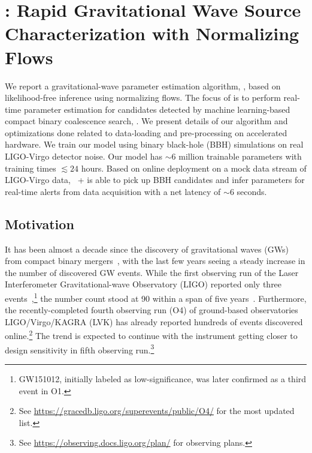\chapter{\amplfi: Rapid Gravitational Wave Source Characterization with Normalizing Flows}
\label{chap:amplfi_methods}
\begin{refsection}

We report a gravitational-wave parameter estimation algorithm, \amplfi, based on likelihood-free inference using normalizing flows. 
The focus of {\amplfi} is to perform real-time parameter estimation for candidates detected by machine learning-based compact binary coalescence search, \aframe. 
We present details of our algorithm and optimizations done related to data-loading and pre-processing on accelerated hardware. 
We train our model using binary black-hole (BBH) simulations on real LIGO-Virgo detector noise. 
Our model has $\sim 6$ million trainable parameters with training times $\lesssim 24$ hours. 
Based on online deployment on a mock data stream of LIGO-Virgo data, {\aframe~+ \amplfi} is able to pick up BBH candidates and infer parameters for real-time alerts from data acquisition with a net latency of $\sim 6$ seconds. 

\section{Motivation}
It has been almost a decade since the discovery of gravitational waves (GWs) from compact binary mergers~\cite{AbEA2016a}, with the last few years seeing a steady increase in the number of discovered GW events.
While the first observing run of the Laser Interferometer Gravitational-wave Observatory (LIGO) reported only three events~\cite{AbEA2016a, AbEA2016g},\footnote{GW151012, initially labeled as low-significance, was later confirmed as a third event in O1.} the number count stood at 90 within a span of five years~\cite{LSC2021djp}.
Furthermore, the recently-completed fourth observing run (O4) of ground-based observatories LIGO/Virgo/KAGRA (LVK) has already reported hundreds of events discovered online.\footnote{See \url{https://gracedb.ligo.org/superevents/public/O4/} for the most updated list.} 
The trend is expected to continue with the instrument getting closer to design sensitivity in fifth observing run.\footnote{See \url{https://observing.docs.ligo.org/plan/} for observing plans.}


\end{refsection}
